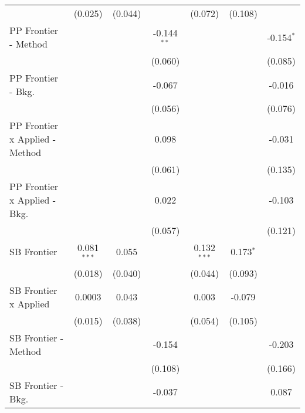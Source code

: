 \begin{tabular}{lcccccc}
                                  & (0.025)        & (0.044)        &                & (0.072)        & (0.108)        &   \\   
   PP Frontier - Method           &                &                & -0.144$^{**}$  &                &                & -0.154$^{*}$\\   
                                  &                &                & (0.060)        &                &                & (0.085)\\   
   PP Frontier - Bkg.             &                &                & -0.067         &                &                & -0.016\\   
                                  &                &                & (0.056)        &                &                & (0.076)\\   
   PP Frontier x Applied - Method &                &                & 0.098          &                &                & -0.031\\   
                                  &                &                & (0.061)        &                &                & (0.135)\\   
   PP Frontier x Applied - Bkg.   &                &                & 0.022          &                &                & -0.103\\   
                                  &                &                & (0.057)        &                &                & (0.121)\\   
   SB Frontier                    & 0.081$^{***}$  & 0.055          &                & 0.132$^{***}$  & 0.173$^{*}$    &   \\   
                                  & (0.018)        & (0.040)        &                & (0.044)        & (0.093)        &   \\   
   SB Frontier x Applied          & 0.0003         & 0.043          &                & 0.003          & -0.079         &   \\   
                                  & (0.015)        & (0.038)        &                & (0.054)        & (0.105)        &   \\   
   SB Frontier - Method           &                &                & -0.154         &                &                & -0.203\\   
                                  &                &                & (0.108)        &                &                & (0.166)\\   
   SB Frontier - Bkg.             &                &                & -0.037         &                &                & 0.087\\   

\end{tabular}
